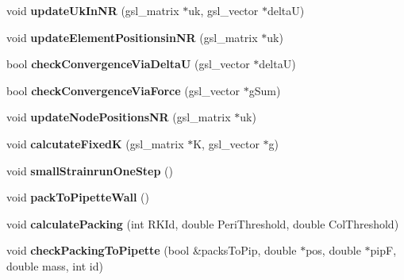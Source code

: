 \begin{DoxyCompactItemize}
\item 
\hypertarget{classSimulation_a938793b4f60eebdd88f7a3a9791819a0}{}void {\bfseries update\+Uk\+In\+N\+R} (gsl\+\_\+matrix $\ast$uk, gsl\+\_\+vector $\ast$delta\+U)\label{classSimulation_a938793b4f60eebdd88f7a3a9791819a0}

\item 
\hypertarget{classSimulation_aed6fc494b468ebd56c07625d3e5984ff}{}void {\bfseries update\+Element\+Positionsin\+N\+R} (gsl\+\_\+matrix $\ast$uk)\label{classSimulation_aed6fc494b468ebd56c07625d3e5984ff}

\item 
\hypertarget{classSimulation_a0bda2f370a66828c5ca3420ddeeb2d4d}{}bool {\bfseries check\+Convergence\+Via\+Delta\+U} (gsl\+\_\+vector $\ast$delta\+U)\label{classSimulation_a0bda2f370a66828c5ca3420ddeeb2d4d}

\item 
\hypertarget{classSimulation_a8a2b44a93f87f9e0de158c4f422ff13c}{}bool {\bfseries check\+Convergence\+Via\+Force} (gsl\+\_\+vector $\ast$g\+Sum)\label{classSimulation_a8a2b44a93f87f9e0de158c4f422ff13c}

\item 
\hypertarget{classSimulation_aea943e8e0caf1b9ff8e40b61248024b6}{}void {\bfseries update\+Node\+Positions\+N\+R} (gsl\+\_\+matrix $\ast$uk)\label{classSimulation_aea943e8e0caf1b9ff8e40b61248024b6}

\item 
\hypertarget{classSimulation_a0964cdce312e239d588d0dd9cade5190}{}void {\bfseries calcutate\+Fixed\+K} (gsl\+\_\+matrix $\ast$K, gsl\+\_\+vector $\ast$g)\label{classSimulation_a0964cdce312e239d588d0dd9cade5190}

\item 
\hypertarget{classSimulation_a977de0c85607b9c8e4422ca90776e72a}{}void {\bfseries small\+Strainrun\+One\+Step} ()\label{classSimulation_a977de0c85607b9c8e4422ca90776e72a}

\item 
\hypertarget{classSimulation_a5400ce12848ff3886d56437519728382}{}void {\bfseries pack\+To\+Pipette\+Wall} ()\label{classSimulation_a5400ce12848ff3886d56437519728382}

\item 
\hypertarget{classSimulation_ab7a42371989ee2ef640dbfb1bfbb21ff}{}void {\bfseries calculate\+Packing} (int R\+K\+Id, double Peri\+Threshold, double Col\+Threshold)\label{classSimulation_ab7a42371989ee2ef640dbfb1bfbb21ff}

\item 
\hypertarget{classSimulation_a4789349db2f4a908064f05e0ee74265d}{}void {\bfseries check\+Packing\+To\+Pipette} (bool \&packs\+To\+Pip, double $\ast$pos, double $\ast$pip\+F, double mass, int id)\label{classSimulation_a4789349db2f4a908064f05e0ee74265d}


\end{DoxyCompactItemize}
